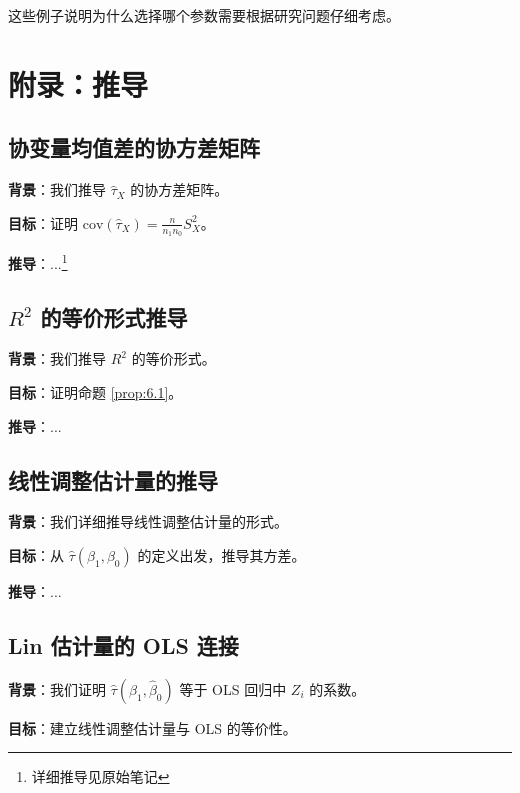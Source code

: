 这些例子说明为什么选择哪个参数需要根据研究问题仔细考虑。


\section{附录：推导}\label{sec:appendix-6}

\subsection{协变量均值差的协方差矩阵}\label{sec:appendix-6-cov-balance}

\textbf{背景}：我们推导 $\hat{\tau}_X$ 的协方差矩阵。

\textbf{目标}：证明 $\text{cov}(\hat{\tau}_X) = \frac{n}{n_1 n_0} S_X^2$。

\textbf{推导}：...\footnote{详细推导见原始笔记}

\subsection{$R^2$ 的等价形式推导}\label{sec:appendix-6-r-squared}

\textbf{背景}：我们推导 $R^2$ 的等价形式。

\textbf{目标}：证明命题 \cref{prop:6.1}。

\textbf{推导}：...

\subsection{线性调整估计量的推导}\label{sec:appendix-6-linear-adj}

\textbf{背景}：我们详细推导线性调整估计量的形式。

\textbf{目标}：从 $\hat{\tau}(\beta_1, \beta_0)$ 的定义出发，推导其方差。

\textbf{推导}：...

\subsection{Lin 估计量的 OLS 连接}\label{sec:appendix-6-ols-connection}

\textbf{背景}：我们证明 $\hat{\tau}(\hat{\beta}_1, \hat{\beta}_0)$ 等于 OLS 回归中 $Z_i$ 的系数。

\textbf{目标}：建立线性调整估计量与 OLS 的等价性。

